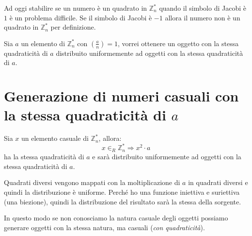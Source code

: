 Ad oggi stabilire se un numero è un quadrato in $\mathbb{Z}_n^*$
quando il simbolo di Jacobi è $1$ è un problema difficile.
Se il simbolo di Jacobi è $-1$ allora il numero non è un quadrato
in $\mathbb{Z}_n^*$ per definizione.

Sia $a$ un elemento di $\mathbb{Z}_n^*$ con $\left(\frac{a}{n} \right) = 1$, 
vorrei ottenere un oggetto con la stessa quadraticità di $a$ 
distribuito uniformemente ad oggetti con la stessa quadraticità di $a$.
\section{Generazione di numeri casuali con la stessa quadraticità di $a$}
Sia $x$ un elemento casuale di $\mathbb{Z}_n^*$, allora:
\[
  x \in_R \mathbb{Z}_n^* \Rightarrow x^2 \cdot a
\]
ha la stessa quadraticità di $a$ e sarà distribuito uniformemente 
ad oggetti con la stessa quadraticità di $a$.

Quadrati diversi vengono mappati con la moltiplicazione di $a$ in quadrati 
diversi e quindi la distribuzione è uniforme.
Perché ho una funzione iniettiva e suriettiva (una biezione), quindi la distribuzione 
del risultato sarà la stessa della sorgente.

In questo modo se non conosciamo la natura casuale degli oggetti possiamo 
generare oggetti con la stessa natura, ma casuali (\textit{con quadraticità}).

